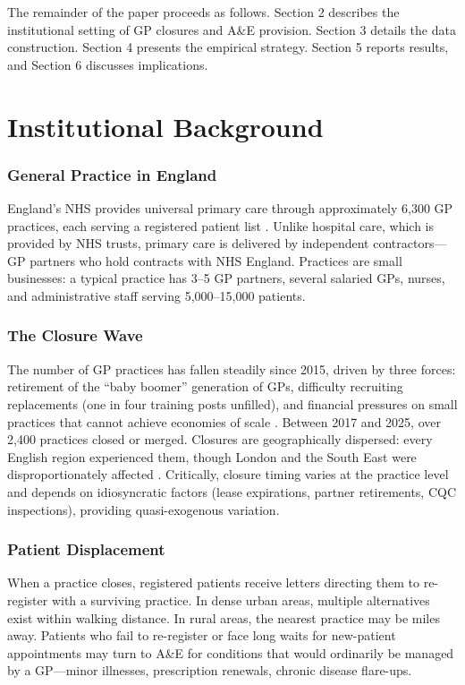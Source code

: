 \documentclass[12pt]{article}
\begin{document}
The remainder of the paper proceeds as follows. Section 2 describes the institutional setting of GP closures and A\&E provision. Section 3 details the data construction. Section 4 presents the empirical strategy. Section 5 reports results, and Section 6 discusses implications.


\section{Institutional Background}

\subsubsection*{General Practice in England}
England's NHS provides universal primary care through approximately 6,300 GP practices, each serving a registered patient list \citep{nhsdigital2024}. Unlike hospital care, which is provided by NHS trusts, primary care is delivered by independent contractors---GP partners who hold contracts with NHS England. Practices are small businesses: a typical practice has 3--5 GP partners, several salaried GPs, nurses, and administrative staff serving 5,000--15,000 patients.

\subsubsection*{The Closure Wave}
The number of GP practices has fallen steadily since 2015, driven by three forces: retirement of the ``baby boomer'' generation of GPs, difficulty recruiting replacements (one in four training posts unfilled), and financial pressures on small practices that cannot achieve economies of scale \citep{bma2023pressures, rcgp2023workforce}. Between 2017 and 2025, over 2,400 practices closed or merged. Closures are geographically dispersed: every English region experienced them, though London and the South East were disproportionately affected \citep{nao2023primary}. Critically, closure timing varies at the practice level and depends on idiosyncratic factors (lease expirations, partner retirements, CQC inspections), providing quasi-exogenous variation.

\subsubsection*{Patient Displacement}
When a practice closes, registered patients receive letters directing them to re-register with a surviving practice. In dense urban areas, multiple alternatives exist within walking distance. In rural areas, the nearest practice may be miles away. Patients who fail to re-register or face long waits for new-patient appointments may turn to A\&E for conditions that would ordinarily be managed by a GP---minor illnesses, prescription renewals, chronic disease flare-ups.
\end{document}
